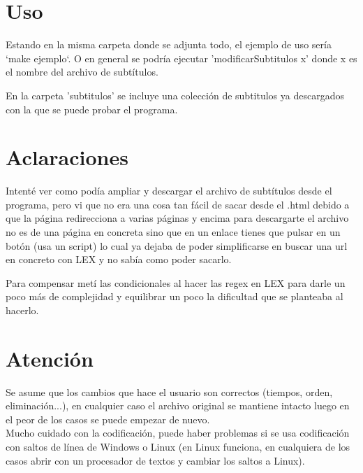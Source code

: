 \documentclass[11pt]{article}
\begin{document}
\section{Uso}
Estando en la misma carpeta donde se adjunta todo, el ejemplo de uso sería `make ejemplo`. O en general se podría ejecutar 'modificarSubtitulos x' donde x es el nombre del archivo de subtítulos. 

En la carpeta 'subtitulos' se incluye una colección de subtitulos ya descargados con la que se puede probar el programa.

\section{Aclaraciones}
Intenté ver como podía ampliar y descargar el archivo de subtítulos desde el programa, pero vi que no era una cosa tan fácil de sacar desde el .html debido a que la página redirecciona a varias páginas y encima para descargarte el archivo no es de una página en concreta sino que en un enlace tienes que pulsar en un botón (usa un script) lo cual ya dejaba de poder simplificarse en buscar una url en concreto con LEX y no sabía como poder sacarlo.

Para compensar metí las condicionales al hacer las regex en LEX para darle un poco más de complejidad y equilibrar un poco la dificultad que se planteaba al hacerlo.

\section{Atención}
Se asume que los cambios que hace el usuario son correctos (tiempos, orden, eliminación...), en cualquier caso el archivo original se mantiene intacto luego en el peor de los casos se puede empezar de nuevo. \\

Mucho cuidado con la codificación, puede haber problemas si se usa codificación con saltos de línea de Windows o Linux (en Linux funciona, en cualquiera de los casos abrir con un procesador de textos y cambiar los saltos a Linux).
\end{document}

